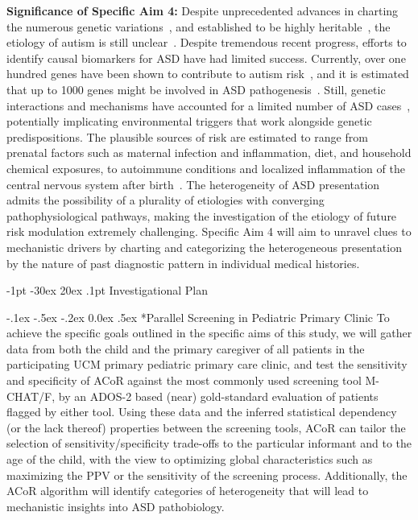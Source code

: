 \documentclass[onecolumn, compsoc,11pt]{IEEEtran}
\makeatletter
\renewcommand\section{\@startsection {section}{1}{\z@}%
                                   {-1pt \@plus -30ex \@minus 20ex}%
                                   {.1pt}%
                                   {\large\bfseries\scshape}}
\renewcommand\paragraph{\@startsection {section}{1}{\z@}%
                                   {-.1ex \@plus -.5ex \@minus -.2ex}%
                                   {0.0ex \@plus.5ex}%
                                   {\fontsize{11}{10}\selectfont\bfseries\itshape\sffamily\color{black}}}
\def\ZERO{ACoR\xspace}
\makeatother
\begin{document}
\textbf{Significance of Specific Aim 4:} 
Despite unprecedented  advances in charting the numerous genetic variations~\cite{Satterstrom484113}, and established to be highly heritable~\cite{sandin17}, the etiology of autism is still unclear~\cite{pmid29691724,pmid29307081}.
Despite tremendous recent progress, efforts to  identify  causal biomarkers for ASD have had limited success. Currently,  over one hundred genes have been shown to contribute to autism risk~\cite{pmid26402605,pmid25038753,Satterstrom484113}, and it is  estimated that up to 1000 genes might be involved in ASD pathogenesis~\cite{pmid27891212}. Still, genetic interactions and mechanisms have accounted for a limited number of ASD cases~\cite{pmid18414403}, potentially implicating   environmental triggers that  work alongside genetic predispositions. The plausible sources of  risk are estimated to range from prenatal  factors such as maternal infection and inflammation, diet, and  household chemical exposures,  to autoimmune conditions and localized inflammation of the central nervous system after birth~\cite{pmid30971960,pmid30941018,pmid29691724,pmid29307081,pmid27351598,pmid26793298,pmid30095240,pmid25681541}. The heterogeneity of ASD presentation  admits the possibility of a plurality of   etiologies with converging pathophysiological pathways, making the investigation of the etiology of future risk modulation extremely challenging. Specific Aim 4 will aim to unravel clues to mechanistic drivers by charting and categorizing the heterogeneous presentation by the nature of past diagnostic pattern in individual medical histories.

 \section{Investigational Plan}
 
\paragraph*{Parallel Screening in Pediatric Primary Clinic} To achieve the specific goals outlined in the specific aims of this study, we will gather data from both the child and the primary caregiver of all patients in the participating UCM primary pediatric primary care clinic, and test the sensitivity and specificity of \ZERO against the most commonly used screening tool M-CHAT/F, by an ADOS-2 based  (near) gold-standard evaluation of   patients flagged by either tool. Using these data and the inferred statistical dependency (or the lack thereof) properties between the screening tools, \ZERO  can tailor the selection of sensitivity/specificity trade-offs  to the particular informant and to the age of the child, with the view to optimizing global characteristics such as maximizing the PPV or the sensitivity of the screening process. Additionally, the \ZERO algorithm will identify categories of heterogeneity that will lead to mechanistic insights into ASD pathobiology.
\end{document}
